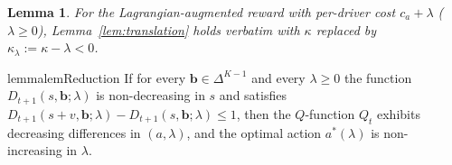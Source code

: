 \documentclass[preprint,11pt,authoryear]{elsarticle}
\newcommand{\bvec}[1]{\mathbf{#1}}
\newtheorem{lemma}{Lemma}
\theoremstyle{remark}
\begin{document}


\begin{lemma}
\label{lem:translation_aug}
For the Lagrangian-augmented reward with per-driver cost $c_a+\lambda$ ($\lambda\ge0$), Lemma~\ref{lem:translation} holds verbatim with $\kappa$ replaced by $\kappa_\lambda := \kappa-\lambda<0$.
\end{lemma}


\begin{restatable}{lemma}{lemReduction}
\label{lem:reduction}
If for every $\bvec{b}\in\Delta^{K-1}$ and every $\lambda \ge 0$ the function $D_{t+1}(s, \bvec{b}; \lambda)$ is non-decreasing in $s$ and satisfies $D_{t+1}(s + v, \bvec{b}; \lambda) - D_{t+1}(s, \bvec{b}; \lambda) \leq 1$, then the $Q$-function $Q_t$ exhibits decreasing differences in $(a, \lambda)$, and the optimal action $a^*(\lambda)$ is non-increasing in $\lambda$.
\end{restatable}
\end{document}
